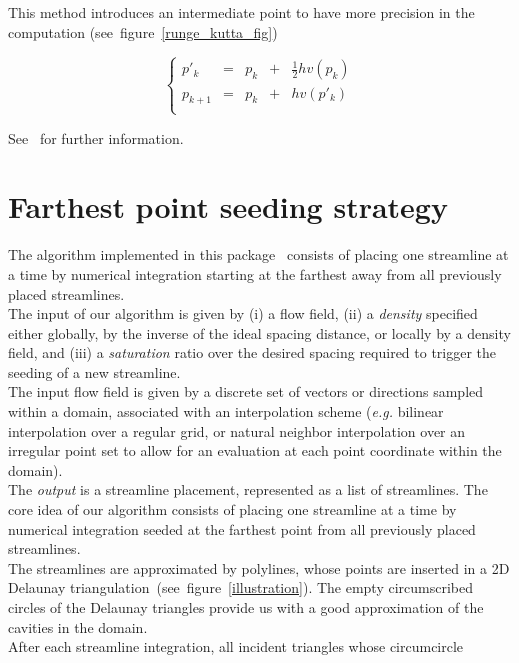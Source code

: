 This method introduces an intermediate point  to have more precision in the computation (see~figure~\ref{runge_kutta_fig})


$$
\left\{ \begin{array}{ccccc}
    p'_k    & = & p_k & + & \frac{1}{2}hv(p_k) \\
    p_{k+1} & = & p_k & + & hv(p'_k)        \\
   \end{array}
\right.
$$

See~\cite{cgal:ptvf-nrcpp-02} for further information.


\section{Farthest point seeding strategy}
\label{Section_2D_Streamlines_Strategy}
The algorithm implemented in this package~\cite{cgal:mad-fpsep-05} consists of
placing one streamline at
a time by numerical integration starting at the farthest away from all
previously placed streamlines.\\The input of our algorithm is given by
(i) a flow field, (ii) a \textit{density} specified either globally, by the
inverse of the ideal spacing distance, or locally by a density field, and (iii)
a \textit{saturation} ratio over the desired spacing required to trigger the
seeding of a new streamline.\\The input flow field is given by a discrete set of
vectors or directions sampled within a domain, associated with an interpolation
scheme (\textit{e.g.} bilinear interpolation over a regular grid, or natural
neighbor interpolation over an irregular point set to
allow for an evaluation at each point coordinate within the domain).\\The
\textit{output} is a streamline placement, represented as a list of streamlines.
The core idea of our algorithm consists of placing one streamline at a time by
numerical integration seeded at the farthest point from all previously placed
streamlines.\\The streamlines are approximated by polylines, whose points are
inserted in a 2D Delaunay triangulation~(see~figure~\ref{illustration}). The empty circumscribed circles of the
Delaunay triangles provide us with a good approximation of the cavities in the
domain.\\After each streamline integration, all incident triangles whose circumcircle
